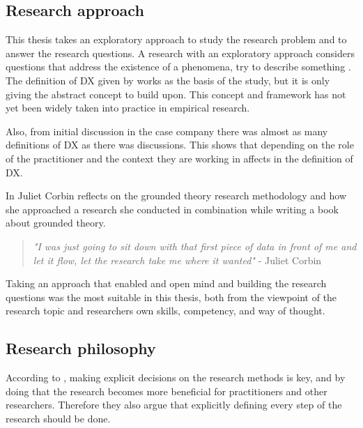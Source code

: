 \documentclass[english, 12pt, a4paper, sci, utf8, a-1b, online]{aaltothesis}
\begin{document}
\subsection{Research approach}

This thesis takes an exploratory approach to study the research problem and to answer the research questions. A research with an exploratory approach considers questions that address the existence of a phenomena, try to describe something \citep{easterbrook2008selecting}. The definition of DX given by \cite{fagerholm-dx-concept-and-definition} works as the basis of the study, but it is only giving the abstract concept to build upon. This concept and framework has not yet been widely taken into practice in empirical research.

Also, from initial discussion in the case company there was almost as many definitions of DX as there was discussions. This shows that depending on the role of the practitioner and the context they are working in affects in the definition of DX.

In \cite{developing-grounded-theory} Juliet Corbin reflects on the grounded theory research methodology and how she approached a research she conducted in combination while writing a book \citep{basics-of-qualitative-research} about grounded theory.

\begin{quotation}
  \textit{"I was just going to sit down with that first piece of data in front of me and let it flow, let the research take me where it wanted"} - Juliet Corbin \citep[p.~43]{developing-grounded-theory}
\end{quotation}

Taking an approach that enabled and open mind and building the research questions was the most suitable in this thesis, both from the viewpoint of the research topic and researchers own skills, competency, and way of thought.


\subsection{Research philosophy} \label{section:research-philosophy}

According to \cite{easterbrook2008selecting}, making explicit decisions on the research methods is key, and by doing that the research becomes more beneficial for practitioners and other researchers. Therefore they also argue that explicitly defining every step of the research should be done.
\end{document}
